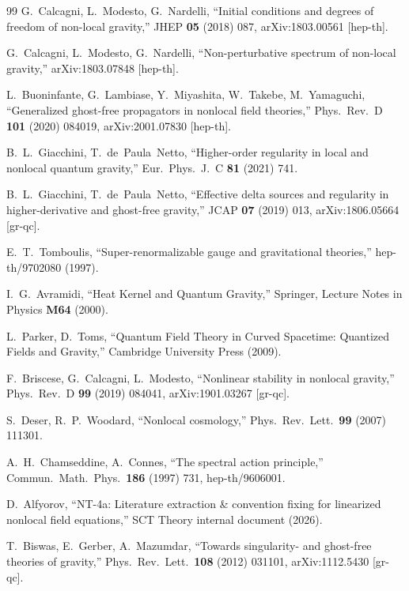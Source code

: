 \documentclass[12pt,a4paper]{article}
\theoremstyle{definition}
\theoremstyle{remark}
\begin{document}
\begin{thebibliography}{99}
  G.~Calcagni, L.~Modesto, G.~Nardelli,
  ``Initial conditions and degrees of freedom of non-local gravity,''
  JHEP \textbf{05} (2018) 087,
  arXiv:1803.00561 [hep-th].

  G.~Calcagni, L.~Modesto, G.~Nardelli,
  ``Non-perturbative spectrum of non-local gravity,''
  arXiv:1803.07848 [hep-th].

  L.~Buoninfante, G.~Lambiase, Y.~Miyashita, W.~Takebe,
  M.~Yamaguchi,
  ``Generalized ghost-free propagators in nonlocal field theories,''
  Phys.\ Rev.\ D \textbf{101} (2020) 084019,
  arXiv:2001.07830 [hep-th].

  B.~L.~Giacchini, T.~de~Paula~Netto,
  ``Higher-order regularity in local and nonlocal quantum gravity,''
  Eur.\ Phys.\ J.\ C \textbf{81} (2021) 741.

  B.~L.~Giacchini, T.~de~Paula~Netto,
  ``Effective delta sources and regularity in
  higher-derivative and ghost-free gravity,''
  JCAP \textbf{07} (2019) 013,
  arXiv:1806.05664 [gr-qc].

  E.~T.~Tomboulis,
  ``Super-renormalizable gauge and gravitational theories,''
  hep-th/9702080 (1997).

  I.~G.~Avramidi,
  ``Heat Kernel and Quantum Gravity,''
  Springer, Lecture Notes in Physics \textbf{M64} (2000).

  L.~Parker, D.~Toms,
  ``Quantum Field Theory in Curved Spacetime: Quantized Fields
  and Gravity,''
  Cambridge University Press (2009).

  F.~Briscese, G.~Calcagni, L.~Modesto,
  ``Nonlinear stability in nonlocal gravity,''
  Phys.\ Rev.\ D \textbf{99} (2019) 084041,
  arXiv:1901.03267 [gr-qc].

  S.~Deser, R.~P.~Woodard,
  ``Nonlocal cosmology,''
  Phys.\ Rev.\ Lett.\ \textbf{99} (2007) 111301.

  A.~H.~Chamseddine, A.~Connes,
  ``The spectral action principle,''
  Commun.\ Math.\ Phys.\ \textbf{186} (1997) 731,
  hep-th/9606001.

  D.~Alfyorov,
  ``NT-4a: Literature extraction \& convention fixing for linearized
  nonlocal field equations,''
  SCT Theory internal document (2026).

  T.~Biswas, E.~Gerber, A.~Mazumdar,
  ``Towards singularity- and ghost-free theories of gravity,''
  Phys.\ Rev.\ Lett.\ \textbf{108} (2012) 031101,
  arXiv:1112.5430 [gr-qc].

\end{thebibliography}
\end{document}
